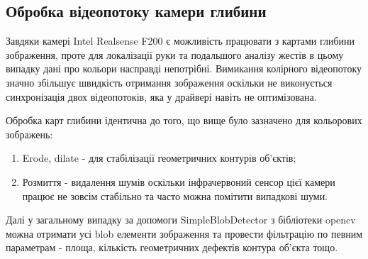 \subsection{Обробка відеопотоку камери глибини}
Завдяки камері Intel Realsense F200 є можливість працювати з картами глибини зображення, проте для локалізації руки та подальшого аналізу жестів в цьому випадку дані про кольори насправді непотрібні. Вимикання колірного відеопотоку значно збільшує швидкість отримання зображення оскільки не виконується синхронізація двох відеопотоків, яка у драйвері навіть не оптимізована.

Обробка карт глибини ідентична до того, що вище було зазначено для кольорових зображень:
\begin{enumerate}
	\item Erode, dilate - для стабілізації геометричних контурів об'єктів;
	\item Розмиття - видалення шумів оскільки інфрачервоний сенсор цієї камери працює не зовсім стабільно та часто можна помітити випадкові шуми.
\end{enumerate}

Далі у загальному випадку за допомоги SimpleBlobDetector з бібліотеки opencv можна отримати усі blob елементи зображення та провести фільтрацію по певним параметрам - площа, кількість геометричних дефектів контура об'єкта тощо.
